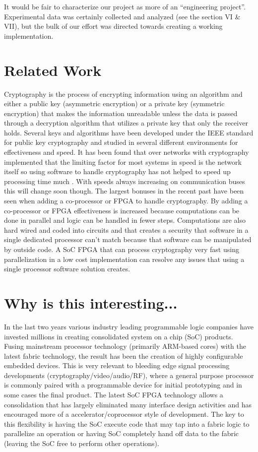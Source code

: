 \documentclass[journal]{IEEEtran}
\begin{document}
It would be fair to characterize our project as more of an “engineering project”.  Experimental data was certainly collected and analyzed (see the section VI \& VII), but the bulk of our effort was directed towards creating a working implementation.

\section{Related Work}
Cryptography is the process of encrypting information using an algorithm and either a public key (asymmetric encryption) or a private key (symmetric encryption) that makes the information unreadable unless the data is passed through a decryption algorithm that utilizes a private key that only the receiver holds\cite{HIPPA}. Several keys and algorithms have been developed under the IEEE standard for public key cryptography \cite{IEEESTD} and studied in several different environments for effectiveness and speed. It has been found that over networks with cryptography implemented that the limiting factor for most systems in speed is the network itself so using software to handle cryptography has not helped to speed up processing time much \cite{GUTMANN}. With speeds always increasing on communication buses this will change soon though. The largest bonuses in the recent past have been seen when adding a co-processor or FPGA to handle cryptography. By adding a co-processor or FPGA effectiveness is increased because computations can be done in parallel and logic can be handled in fewer steps\cite{GUERON}. Computations are also hard wired and coded into circuits and that creates a security that software in a single dedicated processor can’t match because that software can be manipulated by outside code\cite{GUTMANN}. A SoC FPGA that can process cryptography very fast using parallelization in a low cost implementation can resolve any issues that using a single processor software solution creates.

\section{Why is this interesting...}
In the last two years various industry leading programmable logic companies have invested millions in creating consolidated system on a chip (SoC) products. Fusing mainstream processor technology (primarily ARM-based cores) with the latest fabric technology, the result has been the creation of highly configurable embedded devices. This is very relevant to bleeding edge signal processing developments (cryptography/video/audio/RF), where a general purpose processor is commonly paired with a programmable device for initial prototyping and in some cases the final product. The latest SoC FPGA technology allows a consolidation that has largely eliminated many interface design activities and has encouraged more of a accelerator/coprocessor style of development. The key to this flexibility is having the SoC execute code that may tap into a fabric logic to parallelize an operation or having SoC completely hand off data to the fabric (leaving the SoC free to perform other operations).
\end{document}
